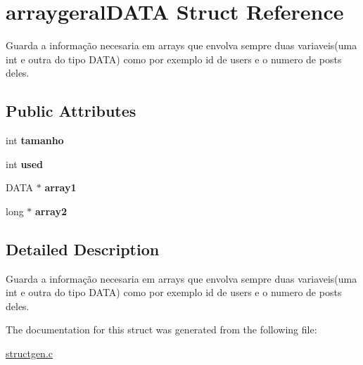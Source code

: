\hypertarget{structarraygeralDATA}{}\section{arraygeral\+D\+A\+TA Struct Reference}
\label{structarraygeralDATA}


Guarda a informação necesaria em arrays que envolva sempre duas variaveis(uma int e outra do tipo D\+A\+T\+A) como por exemplo id de users e o numero de posts deles.  


\subsection*{Public Attributes}
\begin{DoxyCompactItemize}
\item 
int {\bfseries tamanho}\hypertarget{structarraygeralDATA_a66b2eb8c653b5ec17dcbbc0624e6b60d}{}\label{structarraygeralDATA_a66b2eb8c653b5ec17dcbbc0624e6b60d}

\item 
int {\bfseries used}\hypertarget{structarraygeralDATA_aa40b9497df45c38ecb4f2f2161445a8d}{}\label{structarraygeralDATA_aa40b9497df45c38ecb4f2f2161445a8d}

\item 
D\+A\+TA $\ast$ {\bfseries array1}\hypertarget{structarraygeralDATA_accdca5e4ff3c42d77230a8c354451a12}{}\label{structarraygeralDATA_accdca5e4ff3c42d77230a8c354451a12}

\item 
long $\ast$ {\bfseries array2}\hypertarget{structarraygeralDATA_a2600d327db4914884d65efa7cca7fbeb}{}\label{structarraygeralDATA_a2600d327db4914884d65efa7cca7fbeb}

\end{DoxyCompactItemize}


\subsection{Detailed Description}
Guarda a informação necesaria em arrays que envolva sempre duas variaveis(uma int e outra do tipo D\+A\+T\+A) como por exemplo id de users e o numero de posts deles. 

The documentation for this struct was generated from the following file\+:\begin{DoxyCompactItemize}
\item 
\hyperlink{structgen_8c}{structgen.\+c}\end{DoxyCompactItemize}
